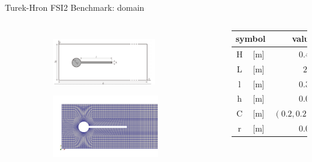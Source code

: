 \documentclass[10pt,t]{beamer}
\begin{document}
\begin{frame}{Turek-Hron FSI2 Benchmark: domain}


\begin{columns}
    \begin{figure}[t]
    \vspace*{-1.5cm}
    \hspace*{-0.2cm}
	\centering
	  \begin{subfigure}[t]{\textwidth}
    \centering
    \includegraphics[width=0.865\textwidth, trim=0 0 50 0, clip]{images/FSI2/FSI2.png}
  \end{subfigure}
  \begin{subfigure}[t]{\textwidth}
    \hspace{3pt}
    \includegraphics[width=0.89\textwidth]{images/FSI2/FSI2-mesh.png}
  \end{subfigure}
	
	
	
	
    \end{figure}
    
    	\scriptsize
		\begin{tabular}{ c c | r } 
			\multicolumn{2}{c|}{symbol} & value   \\
			\hline
			H  & [\si{m}] & $0.41$     \\
			L &  [\si{m}] & $2.5$  \\
			l  & [\si{m}] & $0.35$  \\
			h  & [\si{m}] & $0.02$  \\
			C  & [\si{m}] & $\left(0.2,0.2 \right)$  \\
			r  & [\si{m}] & $0.05$  \\
			\end{tabular}


\end{columns}
\end{frame}
\end{document}
